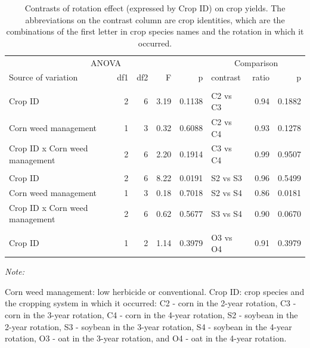 \documentclass[
]{article}
\begin{document}
\begin{table}

\caption{\label{tab:crop-jt-ct}Contrasts of rotation effect (expressed by Crop ID) on crop yields. The abbreviations on the contrast column are crop identities, which are the combinations of the first letter in crop species names and the rotation in which it occurred.}
\centering
\begin{threeparttable}
\begin{tabular}[t]{lrrr>{}r|lrr}
\toprule
\multicolumn{5}{c}{ANOVA} & \multicolumn{3}{c}{Comparison} \\
\cmidrule(l{3pt}r{3pt}){1-5} \cmidrule(l{3pt}r{3pt}){6-8}
Source of variation & df1 & df2 & F & p & contrast & ratio & p\\
\midrule
\addlinespace[0.3em]
\multicolumn{8}{l}{\textbf{(A) - Corn}}\\
\hspace{1em}Crop ID & 2 & 6 & 3.19 & 0.1138 & C2 vs C3 & 0.94 & 0.1882\\
\hspace{1em}Corn weed management & 1 & 3 & 0.32 & 0.6088 & C2 vs C4 & 0.93 & 0.1278\\
\hspace{1em}Crop ID x Corn weed management & 2 & 6 & 2.20 & 0.1914 & C3 vs C4 & 0.99 & 0.9507\\
\addlinespace[0.3em]
\multicolumn{8}{l}{\textbf{(B) - Soybean}}\\
\hspace{1em}Crop ID & 2 & 6 & 8.22 & 0.0191 & S2 vs S3 & 0.96 & 0.5499\\
\hspace{1em}Corn weed management & 1 & 3 & 0.18 & 0.7018 & S2 vs S4 & 0.86 & 0.0181\\
\hspace{1em}Crop ID x Corn weed management & 2 & 6 & 0.62 & 0.5677 & S3 vs S4 & 0.90 & 0.0670\\
\addlinespace[0.3em]
\multicolumn{8}{l}{\textbf{(C) - Oat}}\\
\hspace{1em}Crop ID & 1 & 2 & 1.14 & 0.3979 & O3 vs O4 & 0.91 & 0.3979\\
\bottomrule
\end{tabular}
\begin{tablenotes}[para]
\item \textit{Note: } 
\item Corn weed management: low herbicide or conventional. Crop ID: crop species and the cropping system in which it occurred: C2 - corn in the 2-year rotation, C3 - corn in the 3-year rotation, C4 - corn in the 4-year rotation, S2 - soybean in the 2-year rotation, S3 - soybean in the 3-year rotation, S4 - soybean in the 4-year rotation, O3 - oat in the 3-year rotation, and O4 - oat in the 4-year rotation.
\end{tablenotes}
\end{threeparttable}
\end{table}
\end{document}
